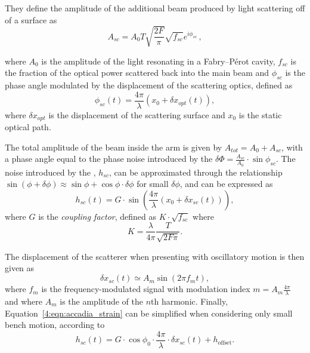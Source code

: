 They define the amplitude of the additional beam produced by light scattering off of a surface as
%
\begin{equation}
    A_{sc} = A_{0} T \sqrt{\frac{2 F}{\pi}} \sqrt{f_{sc}} e^{i \phi_{sc}}\,,
    \label{4:eqn:accadia_amplitude}
\end{equation}

%
where $A_{0}$ is the amplitude of the light resonating in a Fabry–Pérot cavity, $f_{sc}$ is the fraction of the optical power scattered back into the main beam and $\phi_{sc}$ is the phase angle modulated by the displacement of the scattering optics, defined as
%
\begin{equation}
    \phi_{sc}(t) = \frac{4 \pi}{\lambda} ( x_{0} + \delta x_{opt}(t) ),
    \label{4:eqn:accadia_phase_noise}
\end{equation}
%
where $\delta x_{opt}$ is the displacement of the scattering surface and $x_0$ is the static optical path.

The total amplitude of the beam inside the arm is given by $A_{tot} = A_{0} + A_{sc}$, with a phase angle equal to the phase noise introduced by the \scl $\delta \Phi = \frac{A_{sc}}{A_{0}} \cdot \sin \phi_{sc}$. The noise introduced by the \scl, $h_{sc}$, can be approximated through the relationship $\sin(\phi+ \delta\phi) \approx \sin\phi + \cos\phi \cdot \delta\phi$ for small $\delta\phi$, and can be expressed as
%
\begin{equation}
    h_{sc}(t) = G \cdot \sin \left(\frac{4 \pi}{\lambda} (x_{0} + \delta x_{sc}(t) ) \right),
    \label{4:eqn:accadia_strain}
\end{equation}
%
where $G$ is the \textit{coupling factor}, defined as $K \cdot \sqrt{f_{sc}}$ where
%
\begin{equation}
K = \frac{\lambda}{4 \pi} \frac{T}{\sqrt{2 F \pi}}.
\end{equation}
%

The displacement of the scatterer when presenting with oscillatory motion is then given as
%
\begin{equation}
    \delta x_{sc} (t) \simeq A_{m} \sin(2 \pi f_{m} t),
    \label{4:eqn:accadia_oscillatory}
\end{equation}
%
where $f_{m}$ is the frequency-modulated signal with modulation index $m = A_{m} \frac{4 \pi}{\lambda}$ and where $A_{m}$ is the amplitude of the $n$th harmonic. Finally, Equation~\ref{4:eqn:accadia_strain} can be simplified when considering only small bench motion, according to
%
\begin{equation}
    h_{sc}(t) = G \cdot \cos\phi_{0} \cdot \frac{4 \pi}{\lambda} \cdot \delta x_{sc}(t) + h_{\text{offset}}.
    \label{4:eqn:accadia_strain_linearised}
\end{equation}

